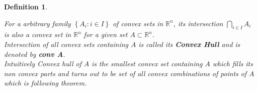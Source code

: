 \documentclass[oneside]{book}
\newtheorem{mydef}{Definition}[section]
\begin{document}
	\begin{mydef}  \label{d:4}
		
		
		For a arbitrary family  $\left\{A_{i}: i \in I\right\}$ of convex sets in   $\mathbb{R}^{n}$, its intersection $\bigcap_{i \in I} A_{i}$ is also a convex set in $\mathbb{R}^{n}$  for a given set $A \subset \mathbb{R}^{n}$.\\ Intersection of all convex sets containing $A$ is called its  \textbf{Convex Hull} and is denoted by  \textbf{conv A}.\\
		Intuitively Convex hull of $A$  is the smallest convex set containing $A$ which fills its non convex parts and turns out to be set of all convex combinations of points of $A$ which is following theorem.
		
	\end{mydef}
	
	
	
\end{document}
